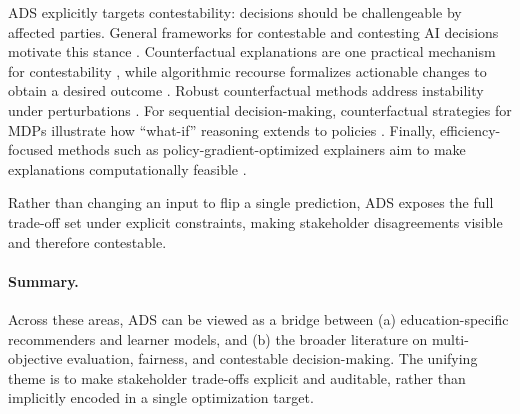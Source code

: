 \documentclass[sigconf,review]{acmart}
\begin{document}
ADS explicitly targets contestability: decisions should be challengeable by affected parties.
General frameworks for contestable and contesting AI decisions motivate this stance \cite{aler2020contestable,alfrink2023contestable,dignum2025contesting}.
Counterfactual explanations are one practical mechanism for contestability \cite{wachter2017counterfactual}, while algorithmic recourse formalizes actionable changes to obtain a desired outcome \cite{ustun2019recourse}.
Robust counterfactual methods address instability under perturbations \cite{robustx2025}.
For sequential decision-making, counterfactual strategies for MDPs illustrate how ``what-if'' reasoning extends to policies \cite{cfmdp2025}.
Finally, efficiency-focused methods such as policy-gradient-optimized explainers aim to make explanations computationally feasible \cite{pan2025fex}.

\noindent
Rather than changing an input to flip a single prediction, ADS exposes the full trade-off set under explicit constraints, making stakeholder disagreements visible and therefore contestable.

\paragraph{Summary.}
Across these areas, ADS can be viewed as a bridge between (a) education-specific recommenders and learner models, and (b) the broader literature on multi-objective evaluation, fairness, and contestable decision-making.
The unifying theme is to make stakeholder trade-offs explicit and auditable, rather than implicitly encoded in a single optimization target.




\end{document}
